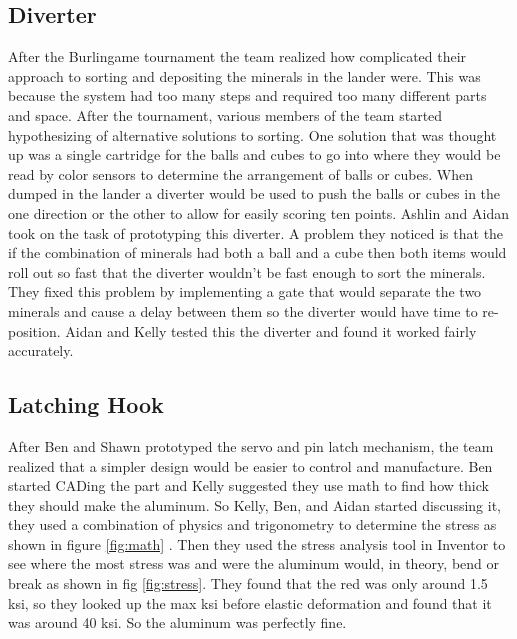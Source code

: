 \documentclass{article}
\begin{document}
\subsection{Diverter}
After the Burlingame tournament the team realized how complicated their approach to sorting and depositing the minerals in the lander were. This was because the system had too many steps and required too many different parts and space. After the tournament, various members of the team started hypothesizing of alternative solutions to sorting. One solution that was thought up was a single cartridge for the balls and cubes to go into where they would be read by color sensors to determine the arrangement of balls or cubes. When dumped in the lander a diverter would be used to push the balls or cubes in the one direction or the other to allow for easily scoring ten points. Ashlin and Aidan took on the task of prototyping this diverter. A problem they noticed is that the if the combination of minerals had both a ball and a cube then both items would roll out so fast that the diverter wouldn't be fast enough to sort the minerals. They fixed this problem by implementing a gate that would separate the two minerals and cause a delay between them so the diverter would have time to re-position. Aidan and Kelly tested this the diverter and found it worked fairly accurately.

\subsection{Latching Hook}
After Ben and Shawn prototyped the servo and pin latch mechanism, the team realized that a simpler design would be easier to control and manufacture. Ben started CADing the part and Kelly suggested they use math to find how thick they should make the aluminum. So Kelly, Ben, and Aidan started discussing it, they used a combination of physics and trigonometry to determine the stress as shown in figure \ref{fig:math} . Then they used the stress analysis tool in Inventor to see where the most stress was and were the aluminum would, in theory, bend or break as shown in fig \ref{fig:stress}. They found that the red was only around 1.5 ksi, so they looked up the max ksi before elastic deformation and found that it was around 40 ksi. So the aluminum was perfectly fine.
\end{document}
